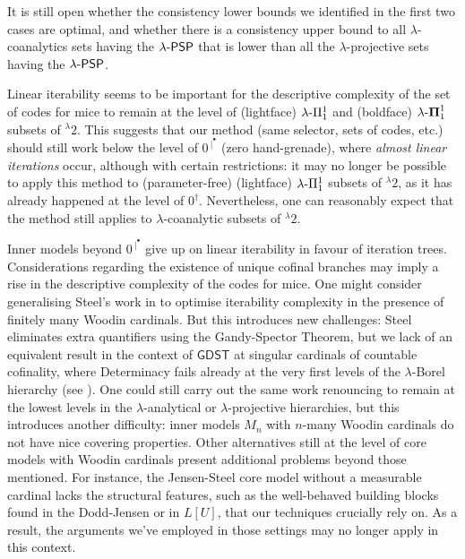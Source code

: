 \documentclass{amsart}
\numberwithin{equation}{section}
\def\hyp{{\hbox{-}}}
\newcommand{\zerohandgrenade}{0^{\: \mid^{\! \! \! \bullet}}}
\theoremstyle{definition}
\theoremstyle{remark}
\begin{document}
It is still open whether the consistency lower bounds we identified in the first two cases are optimal, and whether there is a consistency upper bound to all $\lambda$-coanalytics sets having the $\lambda\hyp\mathsf{PSP}$ that is lower than all the $\lambda$-projective sets having the $\lambda\hyp\mathsf{PSP}$.

Linear iterability seems to be important for the descriptive complexity of the set of codes for mice to remain at the level of (lightface) $\lambda\hyp\Pi^1_1$ and (boldface) $\lambda\hyp\boldsymbol{\Pi}^1_1$ subsets of ${}^{\lambda}2$. This suggests that our method (same selector, sets of codes, etc.) should still work below the level of $\zerohandgrenade$ (zero hand-grenade), where \emph{almost linear iterations} occur, although with certain restrictions: it may no longer be possible to apply this method to (parameter-free) (lightface) $\lambda\hyp\Pi^1_1$ subsets of ${}^{\lambda}2$, as it has already happened at the level of $0^\dagger$. Nevertheless, one can reasonably expect that the method still applies to $\lambda$-coanalytic subsets of ${}^{\lambda}2$.



	Inner models beyond $\zerohandgrenade$ give up on linear iterability in favour of iteration trees. Considerations regarding the existence of unique cofinal branches may imply a rise in the descriptive complexity of the codes for mice. One might consider generalising Steel’s work in \cite{steel1995projectively} to optimise iterability complexity in the presence of finitely many Woodin cardinals. But this introduces new challenges: Steel eliminates extra quantifiers using the Gandy-Spector Theorem, but we lack of an equivalent result in the context of $\mathsf{GDST}$ at singular cardinals of countable cofinality, where Determinacy fails already at the very first levels of the $\lambda$-Borel hierarchy (see \cite[]{DMR}). One could still carry out the same work renouncing to remain at the lowest levels in the $\lambda$-analytical or $\lambda$-projective hierarchies, but this introduces another difficulty: inner models $M_n$ with $n$-many Woodin cardinals do not have nice covering properties. Other alternatives still at the level of core models with Woodin cardinals present additional problems beyond those mentioned. For instance, the Jensen-Steel core model without a measurable cardinal lacks the structural features, such as the well-behaved building blocks found in the Dodd-Jensen or in $L[U]$, that our techniques crucially rely on. As a result, the arguments we've employed in those settings may no longer apply in this context.




    
    

    
\end{document}
